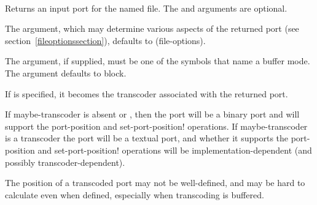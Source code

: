 \begin{entry}{%
\\
}
   

Returns an input port for the named file. The  and
 arguments are optional.

The  argument, which may determine
various aspects of the returned port (see section~\ref{fileoptionssection}),
defaults to {\cf (file-options)}.

The  argument, if supplied,
must be one of the symbols that name a buffer mode.
The  argument defaults to {\cf block}.

If  is specified, it becomes the transcoder associated
with the returned port.

If {\cf maybe-transcoder} is absent or \schfalse{}, then the port will be a
binary port and will support the {\cf port-position} and {\cf
  set-port-position!}  operations.  If {\cf maybe-transcoder} is a
transcoder the port will be a textual port, and whether it supports
the {\cf port-position} and {\cf set-port-position!} operations will
be implementation-dependent (and possibly transcoder-dependent).

\begin{rationale}
  The position of a transcoded port may not be
  well-defined, and may be hard to calculate even when defined,
  especially when transcoding is buffered.
\end{rationale}
\end{entry}

